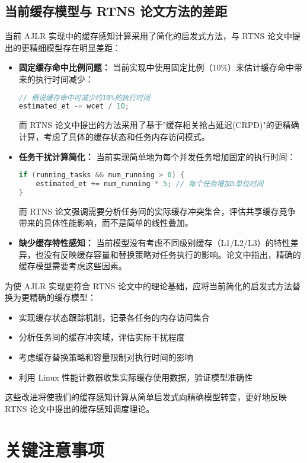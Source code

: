 \documentclass[a4paper,12pt]{article}
\begin{document}
\subsection{当前缓存模型与 RTNS 论文方法的差距}

当前 AJLR 实现中的缓存感知计算采用了简化的启发式方法，与 RTNS 论文中提出的更精细模型存在明显差距：

\begin{itemize}
  \item \textbf{固定缓存命中比例问题：} 当前实现中使用固定比例（10\%）来估计缓存命中带来的执行时间减少：
  \begin{lstlisting}[language=C]
// 假设缓存命中可减少约10%的执行时间
estimated_et -= wcet / 10;
  \end{lstlisting}
  而 RTNS 论文中提出的方法采用了基于"缓存相关抢占延迟(CRPD)"的更精确计算，考虑了具体的缓存状态和任务内存访问模式。
  
  \item \textbf{任务干扰计算简化：} 当前实现简单地为每个并发任务增加固定的执行时间：
  \begin{lstlisting}[language=C]
if (running_tasks && num_running > 0) {
    estimated_et += num_running * 5; // 每个任务增加5单位时间
}
  \end{lstlisting}
  而 RTNS 论文强调需要分析任务间的实际缓存冲突集合，评估共享缓存竞争带来的具体性能影响，而不是简单的线性叠加。
  
  \item \textbf{缺少缓存特性感知：} 当前模型没有考虑不同级别缓存（L1/L2/L3）的特性差异，也没有反映缓存容量和替换策略对任务执行的影响。论文中指出，精确的缓存模型需要考虑这些因素。
\end{itemize}

为使 AJLR 实现更符合 RTNS 论文中的理论基础，应将当前简化的启发式方法替换为更精确的缓存模型：

\begin{itemize}
  \item 实现缓存状态跟踪机制，记录各任务的内存访问集合
  \item 分析任务间的缓存冲突域，评估实际干扰程度
  \item 考虑缓存替换策略和容量限制对执行时间的影响
  \item 利用 Linux 性能计数器收集实际缓存使用数据，验证模型准确性
\end{itemize}

这些改进将使我们的缓存感知计算从简单启发式向精确模型转变，更好地反映 RTNS 论文中提出的缓存感知调度理论。

\section{关键注意事项}
\end{document}
